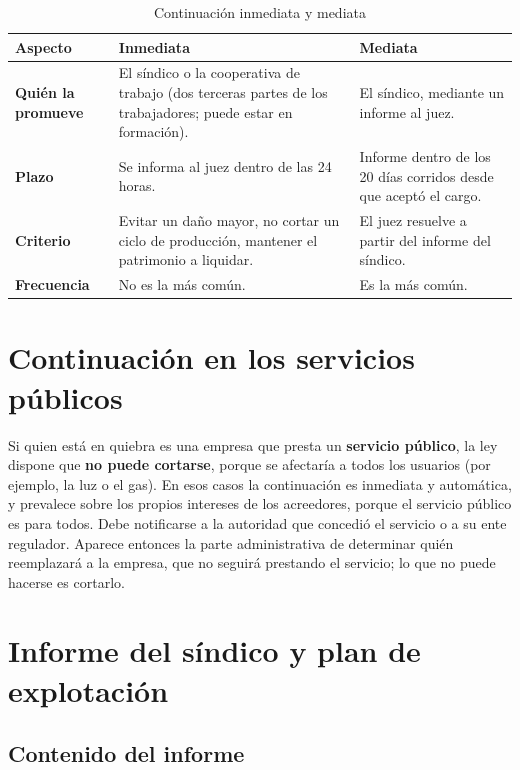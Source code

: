 \documentclass[12pt,oneside]{book}
\begin{document}
\begin{table}[H]
\centering
\small
\caption{Continuación inmediata y mediata}
\begin{tabularx}{\textwidth}{>{\raggedright\arraybackslash}p{} Y Y}
\toprule
\textbf{Aspecto} & \textbf{Inmediata} & \textbf{Mediata} \\
\midrule
\textbf{Quién la promueve} & El síndico o la cooperativa de trabajo (dos terceras partes de los trabajadores; puede estar en formación). & El síndico, mediante un informe al juez. \\
\textbf{Plazo} & Se informa al juez dentro de las 24 horas. & Informe dentro de los 20 días corridos desde que aceptó el cargo. \\
\textbf{Criterio} & Evitar un daño mayor, no cortar un ciclo de producción, mantener el patrimonio a liquidar. & El juez resuelve a partir del informe del síndico. \\
\textbf{Frecuencia} & No es la más común. & Es la más común. \\
\bottomrule
\end{tabularx}
\end{table}

\section{Continuación en los servicios públicos}

Si quien está en quiebra es una empresa que presta un \textbf{servicio público}, la ley dispone que \textbf{no puede cortarse}, porque se afectaría a todos los usuarios (por ejemplo, la luz o el gas). En esos casos la continuación es inmediata y automática, y prevalece sobre los propios intereses de los acreedores, porque el servicio público es para todos. Debe notificarse a la autoridad que concedió el servicio o a su ente regulador. Aparece entonces la parte administrativa de determinar quién reemplazará a la empresa, que no seguirá prestando el servicio; lo que no puede hacerse es cortarlo.

\section{Informe del síndico y plan de explotación}

\subsection{Contenido del informe}
\end{document}
